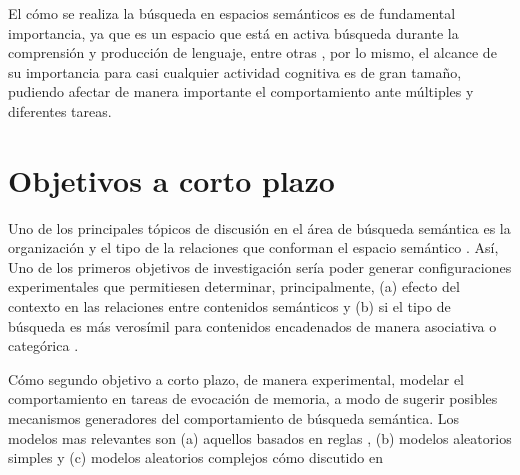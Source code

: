 \documentclass[11pt]{article}
\begin{document}
El cómo se realiza la búsqueda en espacios semánticos es de
fundamental importancia, ya que es un espacio que está en activa
búsqueda durante la comprensión y producción de lenguaje, entre otras
\citep{montezRoleSemanticClustering2015}, por lo mismo, el alcance de su
importancia para casi cualquier actividad cognitiva es de gran tamaño,
pudiendo afectar de manera importante el comportamiento ante múltiples y
diferentes tareas.

\section{Objetivos a corto plazo}
\label{sec:org2c35155}
Uno de los principales tópicos de discusión en el área de búsqueda
semántica es la organización y el tipo de la relaciones que conforman
el espacio semántico \citep{lundProducingHighdimensionalSemantic1996}. Así, Uno de los primeros
objetivos de investigación sería poder generar configuraciones
experimentales que permitiesen determinar, principalmente, (a) efecto
del contexto en las relaciones entre contenidos semánticos
\citep{schillerMemorySpaceUnderstanding2015} y (b) si el tipo de búsqueda es más
verosímil para contenidos encadenados de manera asociativa o categórica
\citep{hillsOptimalForagingSemantic2012}. 

Cómo segundo objetivo a corto plazo, de manera experimental, modelar el
comportamiento en tareas de evocación de memoria, a modo de sugerir posibles
mecanismos generadores del comportamiento de búsqueda semántica. Los modelos mas
relevantes son (a) aquellos basados en reglas
\citep{charnovOptimalForagingMarginal1976}, (b) modelos aleatorios simples
\citep{thompsonWalkingWikipediaScalefree2014} y (c) modelos aleatorios complejos
cómo discutido en \citep{benhamouHowManyAnimals2007}
\end{document}
